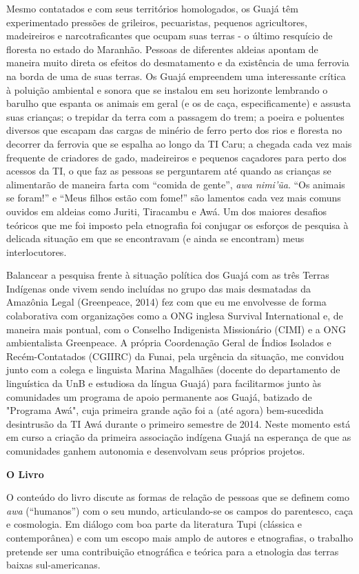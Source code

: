 Mesmo contatados e com seus territórios homologados, os Guajá têm
experimentado pressões de grileiros, pecuaristas, pequenos agricultores,
madeireiros e narcotraficantes que ocupam suas terras - o último
resquício de floresta no estado do Maranhão. Pessoas de diferentes
aldeias apontam de maneira muito direta os efeitos do desmatamento e da
existência de uma ferrovia na borda de uma de suas terras. Os Guajá
empreendem uma interessante crítica à poluição ambiental e sonora que se
instalou em seu horizonte lembrando o barulho que espanta os animais em
geral (e os de caça, especificamente) e assusta suas crianças; o
trepidar da terra com a passagem do trem; a poeira e poluentes diversos
que escapam das cargas de minério de ferro perto dos rios e floresta no
decorrer da ferrovia que se espalha ao longo da TI Caru; a chegada cada
vez mais frequente de criadores de gado, madeireiros e pequenos
caçadores para perto dos acessos da TI, o que faz as pessoas se
perguntarem até quando as crianças se alimentarão de maneira farta com
``comida de gente'', \emph{awa nimi'ũa}. ``Os animais se foram!'' e
``Meus filhos estão com fome!'' são lamentos cada vez mais comuns
ouvidos em aldeias como Juriti, Tiracambu e Awá. Um dos maiores desafios
teóricos que me foi imposto pela etnografia foi conjugar os esforços de
pesquisa à delicada situação em que se encontravam (e ainda se
encontram) meus interlocutores.

Balancear a pesquisa frente à situação política dos Guajá com as três
Terras Indígenas onde vivem sendo incluídas no grupo das mais desmatadas
da Amazônia Legal (Greenpeace, 2014) fez com que eu me envolvesse de
forma colaborativa com organizações como a ONG inglesa Survival
International e, de maneira mais pontual, com o Conselho Indigenista
Missionário (CIMI) e a ONG ambientalista Greenpeace. A própria
Coordenação Geral de Índios Isolados e Recém-Contatados (CGIIRC) da
Funai, pela urgência da situação, me convidou junto com a colega e
linguista Marina Magalhães (docente do departamento de linguística da
UnB e estudiosa da língua Guajá) para facilitarmos junto às comunidades
um programa de apoio permanente aos Guajá, batizado de "Programa Awá",
cuja primeira grande ação foi a (até agora) bem-sucedida desintrusão da
TI Awá durante o primeiro semestre de 2014. Neste momento está em curso
a criação da primeira associação indígena Guajá na esperança de que as
comunidades ganhem autonomia e desenvolvam seus próprios projetos.

\textbf{O Livro}

O conteúdo do livro discute as formas de relação de pessoas que se
definem como \emph{awa} (``humanos'') com o seu mundo, articulando-se os
campos do parentesco, caça e cosmologia. Em diálogo com boa parte da
literatura Tupi (clássica e contemporânea) e com um escopo mais amplo de
autores e etnografias, o trabalho pretende ser uma contribuição
etnográfica e teórica para a etnologia das terras baixas sul-americanas.

